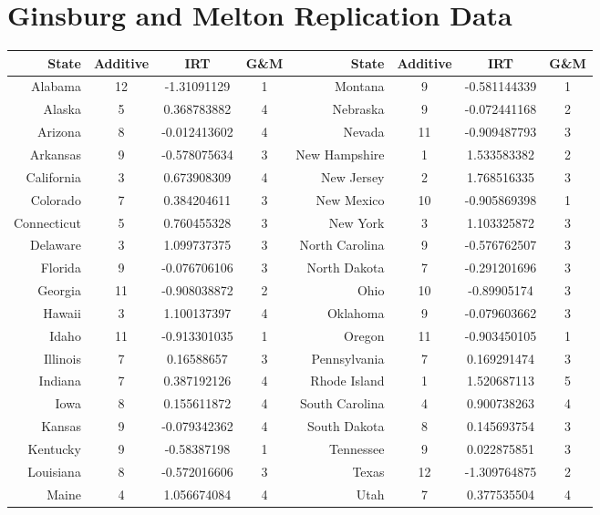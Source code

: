 \documentclass[12pt]{article}
\begin{document}
\section{Ginsburg and Melton Replication Data}\label{GMData}
\begin{table}[!h]\centering\footnotesize
	\begin{tabular}{|r|ccc|r|ccc|}\hline
		State	&	Additive	&	IRT	&	G\&M	&	State	& Additive	&	IRT	&	G\&M	\\	\hline
		Alabama	&	12	&	-1.31091129	&	1	&	Montana	&	9	&	-0.581144339	&	1	\\	
		Alaska	&	5	&	0.368783882	&	4	&	Nebraska	&	9	&	-0.072441168	&	2	\\	
		Arizona	&	8	&	-0.012413602	&	4	&	Nevada	&	11	&	-0.909487793	&	3	\\	
		Arkansas	&	9	&	-0.578075634	&	3	&	New Hampshire	&	1	&	1.533583382	&	2	\\	
		California	&	3	&	0.673908309	&	4	&	New Jersey	&	2	&	1.768516335	&	3	\\	
		Colorado	&	7	&	0.384204611	&	3	&	New Mexico	&	10	&	-0.905869398	&	1	\\	
		Connecticut	&	5	&	0.760455328	&	3	&	New York	&	3	&	1.103325872	&	3	\\	
		Delaware	&	3	&	1.099737375	&	3	&	North Carolina	&	9	&	-0.576762507	&	3	\\	
		Florida	&	9	&	-0.076706106	&	3	&	North Dakota	&	7	&	-0.291201696	&	3	\\	
		Georgia	&	11	&	-0.908038872	&	2	&	Ohio	&	10	&	-0.89905174	&	3	\\	
		Hawaii	&	3	&	1.100137397	&	4	&	Oklahoma	&	9	&	-0.079603662	&	3	\\	
		Idaho	&	11	&	-0.913301035	&	1	&	Oregon	&	11	&	-0.903450105	&	1	\\	
		Illinois	&	7	&	0.16588657	&	3	&	Pennsylvania	&	7	&	0.169291474	&	3	\\	
		Indiana	&	7	&	0.387192126	&	4	&	Rhode Island	&	1	&	1.520687113	&	5	\\	
		Iowa	&	8	&	0.155611872	&	4	&	South Carolina	&	4	&	0.900738263	&	4	\\	
		Kansas	&	9	&	-0.079342362	&	4	&	South Dakota	&	8	&	0.145693754	&	3	\\	
		Kentucky	&	9	&	-0.58387198	&	1	&	Tennessee	&	9	&	0.022875851	&	3	\\	
		Louisiana	&	8	&	-0.572016606	&	3	&	Texas	&	12	&	-1.309764875	&	2	\\	
		Maine	&	4	&	1.056674084	&	4	&	Utah	&	7	&	0.377535504	&	4	\\	

\end{tabular}
\end{table}
\end{document}
